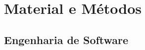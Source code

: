 \chapter{Material e Métodos}
\begin{quote}\normalfont\itshape\vspace*{-2\baselineskip}
\end{quote}

\section{Engenharia de Software}

